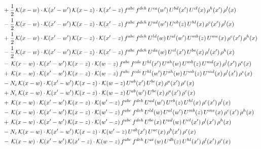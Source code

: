 \documentclass[9pt]{article}
\numberwithin{equation}{section}
\begin{document}
\begin{align}
& +\frac{1}{2}\,\mathcal{K}(x-w)\cdot\mathcal{K}(x'-w')\,\mathcal{K}(x-z)\cdot\mathcal{K}(x'-z)\,f^{abc}\,f^{deh}\,U^{ea}(w')\,U^{bd}(x')\,U^{cl}(x)\,\rho^{h}(x')\,\rho^{l}(x)\notag\\
& -\frac{1}{2}\,\mathcal{K}(x-w)\cdot\mathcal{K}(x'-w')\,\mathcal{K}(x-z)\cdot\mathcal{K}(x'-z)\,f^{abc}\,f^{deh}\,U^{ad}(w')\,U^{eb}(z)\,U^{hl}(x)\,\rho^{c}(x')\,\rho^{l}(x)\notag\\
& +\frac{1}{2}\,\mathcal{K}(x-w)\cdot\mathcal{K}(x'-w')\,\mathcal{K}(x-z)\cdot\mathcal{K}(x'-z)\,f^{abc}\,f^{deh}\,U^{ld}(w)\,U^{al}(w')\,U^{mb}(z)\,U^{me}(x)\,\rho^{c}(x')\,\rho^{h}(x)\notag\\
& -\frac{1}{2}\,\mathcal{K}(x-w)\cdot\mathcal{K}(x'-w')\,\mathcal{K}(x-z)\cdot\mathcal{K}(x'-z)\,f^{abc}\,f^{deh}\,U^{da}(w)\,U^{cl}(x')\,U^{be}(x)\,\rho^{l}(x')\,\rho^{h}(x)\notag\\
& -\,\mathcal{K}(x-w)\cdot\mathcal{K}(x'-w')\,\mathcal{K}(x-z)\cdot\mathcal{K}(w-z)\,f^{abc}\,f^{cde}\,U^{hl}(x')\,U^{ah}(w)\,U^{mb}(z)\,U^{md}(x)\,\rho^{l}(x')\,\rho^{e}(x)\notag\\
& +\,\mathcal{K}(x-w)\cdot\mathcal{K}(x'-w')\,\mathcal{K}(x-z)\cdot\mathcal{K}(w-z)\,f^{abc}\,f^{cde}\,U^{hl}(w')\,U^{ah}(w)\,U^{mb}(z)\,U^{md}(x)\,\rho^{l}(x')\,\rho^{e}(x)\notag\\
& -N_{c}\,\mathcal{K}(x-w)\cdot\mathcal{K}(x'-w')\,\mathcal{K}(x-z)\cdot\mathcal{K}(w-z)\,U^{ab}(x')\,U^{bc}(x)\,\rho^{a}(x')\,\rho^{c}(x)\notag\\
& +N_{c}\,\mathcal{K}(x-w)\cdot\mathcal{K}(x'-w')\,\mathcal{K}(x-z)\cdot\mathcal{K}(w-z)\,U^{ab}(w')\,U^{bc}(x)\,\rho^{a}(x')\,\rho^{c}(x)\notag\\
& +\,\mathcal{K}(x-w)\cdot\mathcal{K}(x'-w')\,\mathcal{K}(x-z)\cdot\mathcal{K}(w'-z)\,f^{abc}\,f^{deh}\,U^{ad}(w')\,U^{eb}(z)\,U^{hl}(x)\,\rho^{c}(x')\,\rho^{l}(x)\notag\\
& -\,\mathcal{K}(x-w)\cdot\mathcal{K}(x'-w')\,\mathcal{K}(x-z)\cdot\mathcal{K}(w'-z)\,f^{abc}\,f^{deh}\,U^{ld}(w)\,U^{al}(w')\,U^{mb}(z)\,U^{me}(x)\,\rho^{c}(x')\,\rho^{h}(x)\notag\\
& +\,\mathcal{K}(x-w)\cdot\mathcal{K}(x'-w')\,\mathcal{K}(x-z)\cdot\mathcal{K}(w'-z)\,f^{abc}\,f^{deh}\,U^{be}(x)\,U^{ad}(w)\,U^{cl}(x')\,\rho^{l}(x')\,\rho^{h}(x)\notag\\
& -N_{c}\,\mathcal{K}(x-w)\cdot\mathcal{K}(x'-w')\,\mathcal{K}(x-z)\cdot\mathcal{K}(w'-z)\,U^{ab}(x')\,U^{ac}(x)\,\rho^{b}(x')\,\rho^{c}(x)\notag\\
& -\,\mathcal{K}(x-w)\cdot\mathcal{K}(x'-w')\,\mathcal{K}(x'-z)\cdot\mathcal{K}(w-z)\,f^{abc}\,f^{deh}\,U^{ae}(w)\,U^{db}(z)\,U^{hl}(x')\,\rho^{l}(x')\,\rho^{c}(x)\notag\\

\end{align}
\end{document}
